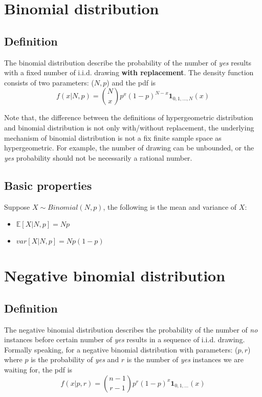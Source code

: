 \documentclass[11pt]{article}
\begin{document}
\section{Binomial distribution}
\subsection{Definition}
The binomial distribution describe the probability of the number of {\it yes} results with a fixed number of i.i.d. drawing {\bf with replacement}. The density function consists of two parameters: ($N,p$) and the pdf is
$$f(x|N,p) = {N\choose x}p^x(1-p)^{N-x}\mathbf{1}_{0,1,...,N}(x)$$

Note that, the difference between the definitions of hypergeometric distribution and binomial distribution is not only with/without replacement, the underlying mechanism of binomial distribution is not a fix finite sample space as hypergeometric. For example, the number of drawing can be unbounded, or the {\it yes} probability should not be necessarily a rational number.

\subsection{Basic properties}
Suppose $X\sim\textit{Binomial}(N,p)$, the following is the mean and variance of $X$:
\begin{itemize}
	\item $\mathbb{E}[X|N,p] = Np$
	\item $var[X|N,p] = Np(1-p)$
\end{itemize}

\section{Negative binomial distribution}
\subsection{Definition}
The negative binomial distribution describes the probability of the number of {\it no} instances before certain number of {\it yes} results in a sequence of i.i.d. drawing. Formally speaking, for a negative binomial distribution with parameters: ($p,r$) where $p$ is the probability of {\it yes} and $r$ is the number of {\it yes} instances we are waiting for, the pdf is
$$f(x|p,r) = {n-1\choose r-1}p^r(1-p)^x\mathbf{1}_{0,1,...}(x)$$
\end{document}
